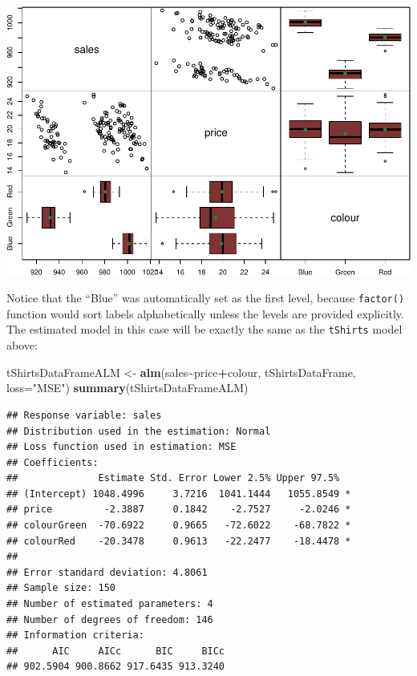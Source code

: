 \documentclass[
]{book}
\newenvironment{Shaded}{\begin{snugshade}}{\end{snugshade}}
\newcommand{\AttributeTok}[1]{\textcolor[rgb]{0.13,0.29,0.53}{#1}}
\newcommand{\FunctionTok}[1]{\textcolor[rgb]{0.13,0.29,0.53}{\textbf{#1}}}
\newcommand{\NormalTok}[1]{#1}
\newcommand{\OtherTok}[1]{\textcolor[rgb]{0.56,0.35,0.01}{#1}}
\newcommand{\SpecialCharTok}[1]{\textcolor[rgb]{0.81,0.36,0.00}{\textbf{#1}}}
\newcommand{\StringTok}[1]{\textcolor[rgb]{0.31,0.60,0.02}{#1}}
\theoremstyle{definition}
\theoremstyle{definition}
\theoremstyle{definition}
\theoremstyle{definition}
\theoremstyle{remark}
\begin{document}
\includegraphics{Svetunkov---Statistics-for-Business-Analytics_files/figure-latex/unnamed-chunk-101-1.pdf}

Notice that the ``Blue'' was automatically set as the first level, because \texttt{factor()} function would sort labels alphabetically unless the levels are provided explicitly. The estimated model in this case will be exactly the same as the \texttt{tShirts} model above:

\begin{Shaded}
\begin{Highlighting}[]
\NormalTok{tShirtsDataFrameALM }\OtherTok{\textless{}{-}} \FunctionTok{alm}\NormalTok{(sales}\SpecialCharTok{\textasciitilde{}}\NormalTok{price}\SpecialCharTok{+}\NormalTok{colour, tShirtsDataFrame, }\AttributeTok{loss=}\StringTok{"MSE"}\NormalTok{)}
\FunctionTok{summary}\NormalTok{(tShirtsDataFrameALM)}
\end{Highlighting}
\end{Shaded}

\begin{verbatim}
## Response variable: sales
## Distribution used in the estimation: Normal
## Loss function used in estimation: MSE
## Coefficients:
##              Estimate Std. Error Lower 2.5% Upper 97.5%  
## (Intercept) 1048.4996     3.7216  1041.1444   1055.8549 *
## price         -2.3887     0.1842    -2.7527     -2.0246 *
## colourGreen  -70.6922     0.9665   -72.6022    -68.7822 *
## colourRed    -20.3478     0.9613   -22.2477    -18.4478 *
## 
## Error standard deviation: 4.8061
## Sample size: 150
## Number of estimated parameters: 4
## Number of degrees of freedom: 146
## Information criteria:
##      AIC     AICc      BIC     BICc 
## 902.5904 900.8662 917.6435 913.3240
\end{verbatim}
\end{document}
